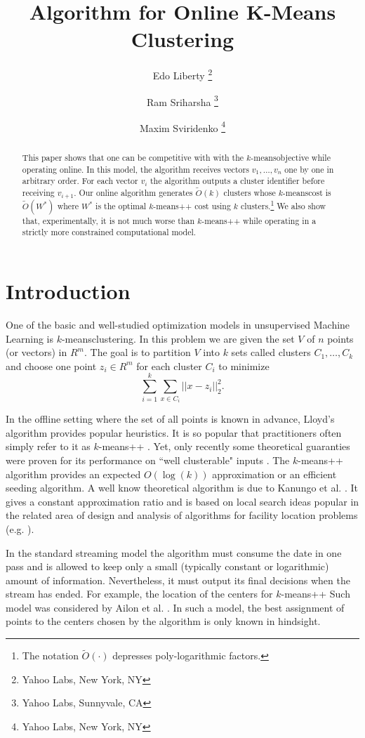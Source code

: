 \documentclass[11pt,twoside]{article}
\title{Algorithm for Online K-Means Clustering}
\author{
	Edo Liberty \thanks{Yahoo Labs, New York, NY}
		\and
	Ram Sriharsha \thanks{Yahoo Labs, Sunnyvale, CA}
       		\and 
	Maxim Sviridenko \thanks{Yahoo Labs, New York, NY}
}
\newcommand{\kmpp}{$k$-means++ }
\newcommand{\kmeans}{$k$-means}
\begin{document}
\date{}
\maketitle{}
\mbox{}
\begin{abstract}
This paper shows that one can be competitive with with the \kmeans objective while operating online.
In this model, the algorithm receives vectors $v_1,\ldots,v_n$ one by one in arbitrary order. 
For each vector $v_i$ the algorithm outputs a cluster identifier before receiving $v_{i+1}$.
Our online algorithm generates $\tilde{O}(k)$ clusters whose \kmeans cost is $\tilde{O}(W^*)$ where $W^*$ is the optimal \kmpp cost using $k$ clusters.\footnote{The notation $\tilde{O}(\cdot)$ depresses poly-logarithmic factors.}
We also show that, experimentally, it is not much worse than \kmpp while operating in a strictly more constrained computational model.
\end{abstract}
\section{Introduction}

One of the basic and well-studied optimization models in unsupervised Machine Learning is \kmeans clustering. In this problem we are given the set $V$ of $n$ points (or vectors) in $R^m$. The goal is to partition $V$ into $k$ sets called clusters $C_1,\dots, C_k$ and choose one point $z_i\in R^m$ for each cluster $C_i$ to minimize 
$$\sum_{i=1}^{k} \sum_{x\in C_i} ||x-z_i||_2^2.$$

In the offline setting where the set of all points is known in advance, Lloyd's algorithm \cite{Lloyd82} provides popular heuristics. 
It is so popular that practitioners often simply refer to it as \kmpp. 
Yet, only recently some theoretical guaranties were proven for its performance on ``well clusterable" inputs \cite{OstrovskyRSS12}.
The \kmpp \cite{ArthurV07} algorithm provides an expected  $O(\log(k))$ approximation or an efficient seeding algorithm. 
A well know theoretical algorithm is due to Kanungo et al. \cite{KanungoMNPSW02}. 
It gives a constant approximation ratio and is based on local search ideas popular in the related area of design and analysis of algorithms for facility location problems (e.g. \cite{AryaGKMMP04}).


In the standard streaming model the algorithm must consume the date in one pass and is allowed to keep only a small (typically constant or logarithmic) amount of information. 
Nevertheless, it must output its final decisions when the stream has ended. For example, the location of the centers for \kmpp
Such model was considered by Ailon et al. \cite{AilonJM09}. In such a model, the best assignment of points to the centers chosen by the algorithm is only known in hindsight.
\end{document}
